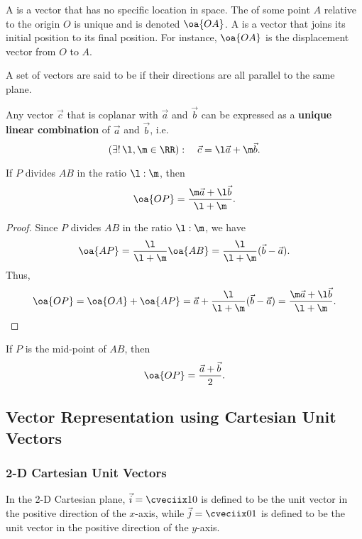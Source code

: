 \begin{definition}
    A  is a vector that has no specific location in space. The  of some point $A$ relative to the origin $O$ is unique and is denoted $\oa{OA}$. A  is a vector that joins its initial position to its final position. For instance, $\oa{OA}$ is the displacement vector from $O$ to $A$.
\end{definition}

\begin{definition}
    A set of vectors are said to be  if their directions are all parallel to the same plane.
\end{definition}

\begin{fact}
    Any vector $\vec c$ that is coplanar with $\vec a$ and $\vec b$ can be expressed as a \textbf{unique linear combination} of $\vec a$ and $\vec b$, i.e. \[(\exists! \, \l, \m \in \RR): \quad \vec c = \l \vec a + \m \vec b.\]
\end{fact}

\begin{theorem}
    If $P$ divides $AB$ in the ratio $\l : \m$, then \[\oa{OP} = \frac{\m \vec a + \l \vec b}{\l + \m}.\]
\end{theorem}
\begin{proof}
    Since $P$ divides $AB$ in the ratio $\l : \m$, we have \[\oa{AP} = \frac{\l}{\l + \m} \oa{AB} = \frac{\l}{\l + \m} (\vec b - \vec a).\] Thus, \[\oa{OP} = \oa{OA} + \oa{AP} = \vec a + \frac{\l}{\l + \m} (\vec b - \vec a) = \frac{\m \vec a + \l \vec b}{\l + \m}.\]
\end{proof}

\begin{corollary}
    If $P$ is the mid-point of $AB$, then \[\oa{OP} = \frac{\vec a + \vec b}{2}.\]
\end{corollary}

\subsection{Vector Representation using Cartesian Unit Vectors}

\subsubsection{2-D Cartesian Unit Vectors}

\begin{definition}
    In the 2-D Cartesian plane, $\vec i = \cveciix10$ is defined to be the unit vector in the positive direction of the $x$-axis, while $\vec j = \cveciix01$ is defined to be the unit vector in the positive direction of the $y$-axis.
\end{definition}

